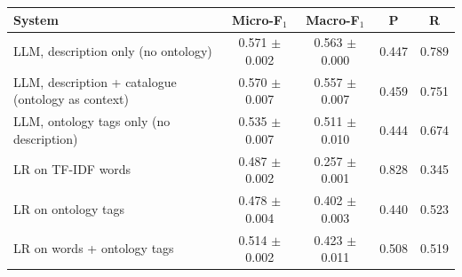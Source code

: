 \begin{tabular}{lcccc}
\toprule
System & Micro-F$_1$ & Macro-F$_1$ & P & R \\
\midrule
LLM, description only (no ontology) & 0.571 $\pm$ 0.002 & 0.563 $\pm$ 0.000 & 0.447 & 0.789 \\
LLM, description + catalogue (ontology as context) & 0.570 $\pm$ 0.007 & 0.557 $\pm$ 0.007 & 0.459 & 0.751 \\
LLM, ontology tags only (no description) & 0.535 $\pm$ 0.007 & 0.511 $\pm$ 0.010 & 0.444 & 0.674 \\
LR on TF-IDF words & 0.487 $\pm$ 0.002 & 0.257 $\pm$ 0.001 & 0.828 & 0.345 \\
LR on ontology tags & 0.478 $\pm$ 0.004 & 0.402 $\pm$ 0.003 & 0.440 & 0.523 \\
LR on words + ontology tags & 0.514 $\pm$ 0.002 & 0.423 $\pm$ 0.011 & 0.508 & 0.519 \\
\bottomrule
\end{tabular}
